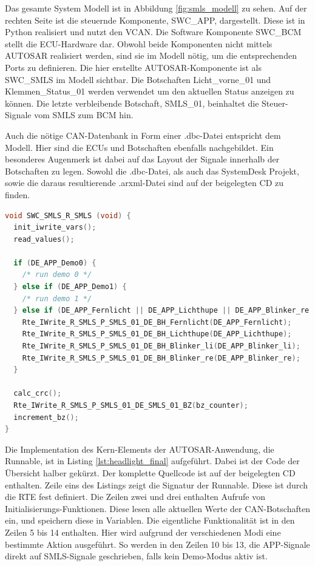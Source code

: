 \documentclass[
  a4paper,					    %
  twoside,
  DIV=calc,     				%
  bibliography=totoc,
  cleardoublepage=empty,
  ngerman,     					%
  final       					%
]{scrbook}
\begin{document}
Das gesamte System Modell ist in Abbildung \ref{fig:smls_modell} zu sehen. Auf der rechten Seite ist die steuernde Komponente, SWC\_APP, dargestellt. Diese ist in Python realisiert und nutzt den VCAN. Die Software Komponente SWC\_BCM stellt die ECU-Hardware dar. Obwohl beide Komponenten nicht mittels AUTOSAR realisiert werden, sind sie im Modell nötig, um die entsprechenden Ports zu definieren. Die hier erstellte AUTOSAR-Komponente ist als SWC\_SMLS im Modell sichtbar. Die Botschaften Licht\_vorne\_01 und Klemmen\_Status\_01 werden verwendet um den aktuellen Status anzeigen zu können. Die letzte verbleibende Botschaft, SMLS\_01, beinhaltet die Steuer-Signale vom SMLS zum BCM hin.

Auch die nötige CAN-Datenbank in Form einer .dbc-Datei entspricht dem Modell. Hier sind die ECUs und Botschaften ebenfalls nachgebildet. Ein besonderes Augenmerk ist dabei auf das Layout der Signale innerhalb der Botschaften zu legen. Sowohl die .dbc-Datei, als auch das SystemDesk Projekt, sowie die daraus resultierende .arxml-Datei sind auf der beigelegten CD zu finden.


\begin{lstlisting}[frame=single, language=C, basicstyle=\footnotesize, caption={Implementation der Runnable}, label={lst:headlight_final}]
void SWC_SMLS_R_SMLS (void) {
  init_iwrite_vars();
  read_values();

  if (DE_APP_Demo0) {
    /* run demo 0 */
  } else if (DE_APP_Demo1) {
    /* run demo 1 */
  } else if (DE_APP_Fernlicht || DE_APP_Lichthupe || DE_APP_Blinker_re || DE_APP_Blinker_li) {
    Rte_IWrite_R_SMLS_P_SMLS_01_DE_BH_Fernlicht(DE_APP_Fernlicht);
    Rte_IWrite_R_SMLS_P_SMLS_01_DE_BH_Lichthupe(DE_APP_Lichthupe);
    Rte_IWrite_R_SMLS_P_SMLS_01_DE_BH_Blinker_li(DE_APP_Blinker_li);
    Rte_IWrite_R_SMLS_P_SMLS_01_DE_BH_Blinker_re(DE_APP_Blinker_re);	
  }

  calc_crc();
  Rte_IWrite_R_SMLS_P_SMLS_01_DE_SMLS_01_BZ(bz_counter);
  increment_bz();	
}
\end{lstlisting}

Die Implementation des Kern-Elements der AUTOSAR-Anwendung, die Runnable, ist in Listing \ref{lst:headlight_final} aufgeführt. Dabei ist der Code der Übersicht halber gekürzt. Der komplette Quellcode ist auf der beigelegten CD enthalten. Zeile eins des Listings zeigt die Signatur der Runnable. Diese ist durch die RTE fest definiert. Die Zeilen zwei und drei enthalten Aufrufe von Initialisierungs-Funktionen. Diese lesen alle aktuellen Werte der CAN-Botschaften ein, und speichern diese in Variablen. Die eigentliche Funktionalität ist in den Zeilen 5 bis 14 enthalten. Hier wird aufgrund der verschiedenen Modi eine bestimmte Aktion ausgeführt. So werden in den Zeilen 10 bis 13, die APP-Signale direkt auf SMLS-Signale geschrieben, falls kein Demo-Modus aktiv ist.
\end{document}
